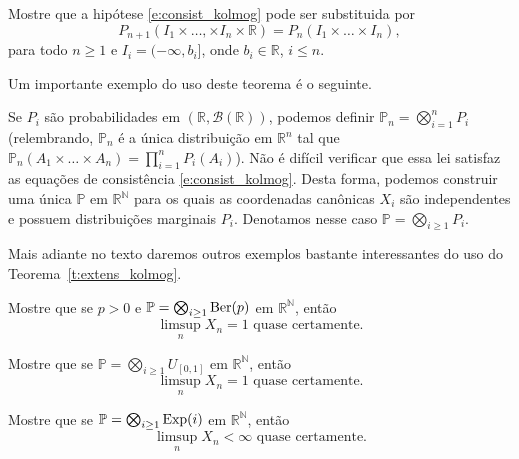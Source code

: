 \begin{exercise}
  Mostre que a hipótese \eqref{e:consist_kolmog} pode ser substituida por
  \begin{equation}
    P_{n+1} (I_1 \times \dots, \times I_n \times \mathbb{R}) = P_n (I_1 \times \dots \times I_n),
  \end{equation}
  para todo $n \geq 1$ e $I_i = (-\infty, b_i]$, onde $b_i \in \mathbb{R}$, $i \leq n$.
\end{exercise}

Um importante exemplo do uso deste teorema é o seguinte.

\begin{example}
  Se $P_i$ são probabilidades em $(\mathbb{R}, \mathcal{B}(\mathbb{R}))$, podemos definir $\mathbb{P}_n = \bigotimes_{i=1}^n P_i$ (relembrando, $\mathbb{P}_n$ é a única distribuição em $\mathbb{R}^n$ tal que $\mathbb{P}_n(A_1 \times \dots \times A_n) = \prod_{i=1}^n P_i(A_i)$).
  Não é difícil verificar que essa lei satisfaz as equações de consistência \eqref{e:consist_kolmog}.
  Desta forma, podemos construir uma única $\mathbb{P}$ em $\mathbb{R}^\mathbb{N}$ para os quais as coordenadas canônicas $X_i$ são independentes e possuem distribuições marginais $P_i$.
  Denotamos nesse caso $\mathbb{P} = \bigotimes_{i \geq 1} P_i$.
\end{example}

Mais adiante no texto daremos outros exemplos bastante interessantes do uso do Teorema~\ref{t:extens_kolmog}.

\begin{exercise}
  Mostre que se $p > 0$ e $\mathbb{P} = \bigotimes_{i \geq 1} \operatorname{Ber}(p)$ em $\mathbb{R}^\mathbb{N}$, então
  \begin{equation}
    \text{$\limsup_n X_n = 1$ quase certamente.}
  \end{equation}
\end{exercise}

\begin{exercise}
  Mostre que se $\mathbb{P} = \bigotimes_{i \geq 1} U_{[0,1]}$ em $\mathbb{R}^\mathbb{N}$, então
  \begin{equation}
    \text{$\limsup_n X_n = 1$ quase certamente.}
  \end{equation}
\end{exercise}

\begin{exercise}
  Mostre que se $\mathbb{P} = \bigotimes_{i \geq 1} \operatorname{Exp}(i)$ em $\mathbb{R}^\mathbb{N}$, então
  \begin{equation}
    \text{$\limsup_n X_n < \infty$ quase certamente.}
  \end{equation}
\end{exercise}

